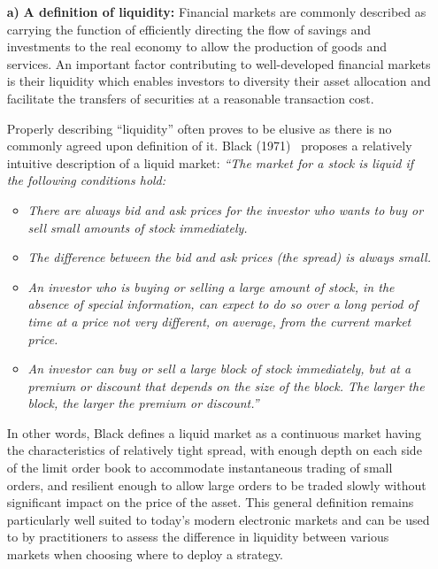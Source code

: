 \begin{enumerate}
\item[\textbf{a)}] \textbf{A definition of liquidity:} Financial markets are commonly described as carrying the function of efficiently directing the flow of savings and investments to the real economy to allow the production of goods and services. An important factor contributing to well-developed financial markets is their liquidity which enables investors to diversity their asset allocation and facilitate the transfers of securities at a reasonable transaction cost. 


Properly describing ``liquidity'' often proves to be elusive as there is no commonly agreed upon definition of it. Black (1971)~\cite{black71} proposes a relatively intuitive description of a liquid market:
\textit{``The market for a stock is liquid if the following conditions hold:}

\begin{itemize}
\item \textit{There are always bid and ask prices for the investor who wants to buy or sell small amounts of stock immediately.}

\item \textit{The difference between the bid and ask prices (the spread) is always small.}

\item \textit{An investor who is buying or selling a large amount of stock, in the absence of special information, can expect to do so over a long period of time at a price not very different, on average, from the current market price.}

\item \textit{An investor can buy or sell a large block of stock immediately, but at a premium or discount that depends on the size of the block. The larger the block, the larger the premium or discount.''}
	\end{itemize}
In other words, Black defines a liquid market as a continuous market having the characteristics of relatively tight spread, with enough depth on each side of the limit order book to accommodate instantaneous trading of small orders, and resilient enough to allow large orders to be traded slowly without significant impact on the price of the asset. This general definition remains particularly well suited to today's modern electronic markets and can be used to by practitioners to assess the difference in liquidity between various markets when choosing where to deploy a strategy.


\end{enumerate}
